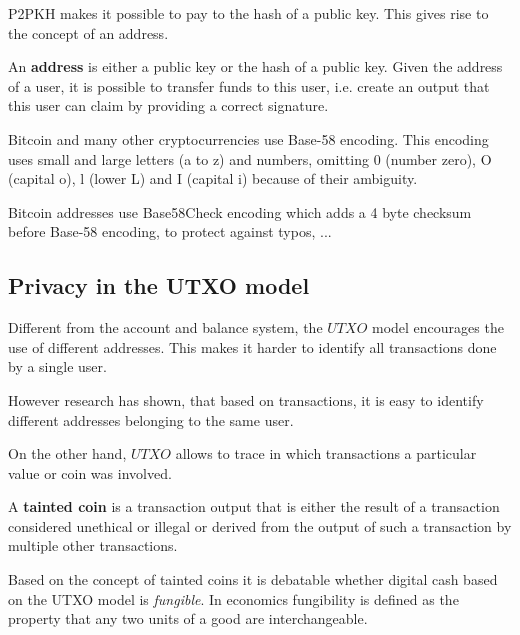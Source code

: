 
P2PKH makes it possible to pay to the hash of a public key.
This gives rise to the concept of an address.

\begin{definition} An \textbf{address} is either a public key or the hash of a public key. Given the address of a user, it is possible to transfer funds to this user, i.e. create an output that this user can claim by providing a correct signature.
\end{definition}

\begin{note}
Bitcoin and many other cryptocurrencies use Base-58 encoding. This encoding uses small and large letters (a to z) and numbers, omitting 0 (number zero), O (capital o), l (lower L) and I (capital i) because of their ambiguity.

Bitcoin addresses use Base58Check encoding which adds a 4 byte checksum before Base-58 encoding, to protect against typos, ...
\end{note}


\subsection{Privacy in the UTXO model}
Different from the account and balance system, the $UTXO$ model encourages the use of different addresses. This makes it harder to identify all transactions done by a single user.

However research has shown, that based on transactions, it is easy to identify different addresses belonging to the same user.

On the other hand, $UTXO$ allows to trace in which transactions a particular value or coin was involved.

\begin{definition}
A \textbf{tainted coin} is a transaction output that is either the result of a transaction considered unethical or illegal or derived from the output of such a transaction by multiple other transactions.
\end{definition}

\begin{note}
Based on the concept of tainted coins it is debatable whether digital cash based on the UTXO model is \emph{fungible}. In economics fungibility is defined as the property that any two units of a good are interchangeable.
\end{note}

